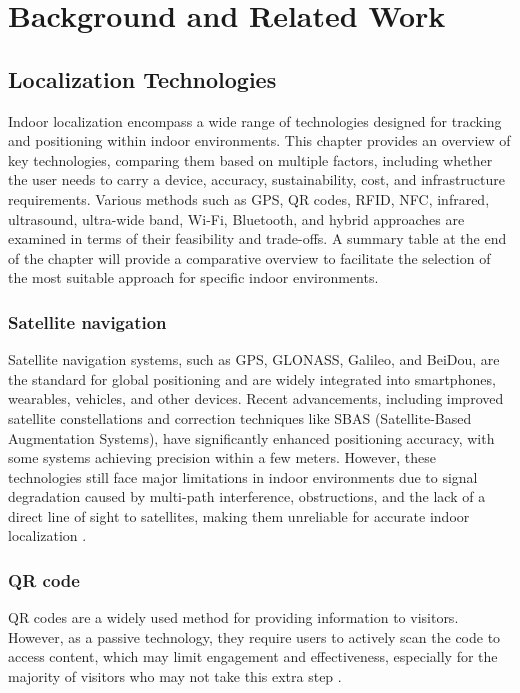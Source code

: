 \chapter{Background and Related Work}
\label{chap:background}

\section{Localization Technologies}

Indoor localization encompass a wide range of technologies designed for tracking and positioning within indoor environments. This chapter provides an overview of key technologies, comparing them based on multiple factors, including whether the user needs to carry a device, accuracy, sustainability, cost, and infrastructure requirements. Various methods such as GPS, QR codes, RFID, NFC, infrared, ultrasound, ultra-wide band, Wi-Fi, Bluetooth, and hybrid approaches are examined in terms of their feasibility and trade-offs. A summary table at the end of the chapter will provide a comparative overview to facilitate the selection of the most suitable approach for specific indoor environments.

\subsection{Satellite navigation}

Satellite navigation systems, such as GPS, GLONASS, Galileo, and BeiDou, are the standard for global positioning and are widely integrated into smartphones, wearables, vehicles, and other devices. Recent advancements, including improved satellite constellations and correction techniques like SBAS (Satellite-Based Augmentation Systems), have significantly enhanced positioning accuracy, with some systems achieving precision within a few meters. However, these technologies still face major limitations in indoor environments due to signal degradation caused by multi-path interference, obstructions, and the lack of a direct line of sight to satellites, making them unreliable for accurate indoor localization \cite{mainetti_survey_2014}. 

\subsection{QR code}

QR codes are a widely used method for providing information to visitors. However, as a passive technology, they require users to actively scan the code to access content, which may limit engagement and effectiveness, especially for the majority of visitors who may not take this extra step \cite{spachos_ble_2020}. 

